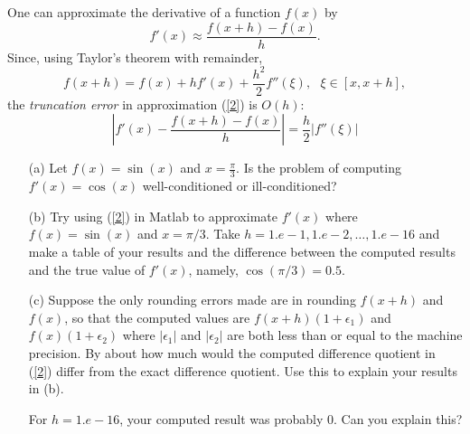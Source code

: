 \documentclass[10pt]{article}
\begin{document}
\begin{problem}[Problem 5]
    One can approximate the derivative of a function \( f(x) \) by
\begin{equation}
f' (x) \approx \frac{f(x+h)-f(x)}{h} . \label{2}
\end{equation}
Since, using Taylor's theorem with remainder,
\[ f(x+h) = f(x) + h f' (x) + \frac{h^2}{2} f'' ( \xi ) ,~~~\xi \in [x, x+h] , \]
the {\em truncation error} in approximation (\ref{2}) is $O(h)$:
\[ \left| f'(x) - \frac{f(x+h)-f(x)}{h} \right| = \frac{h}{2} \left| f'' ( \xi ) \right| \]
\begin{enumerate}
    \item[(a)] Let $f(x) = \sin (x)$ and $x = \frac{\pi}{3}$.  Is the problem of computing $f' (x) = \cos (x)$ well-conditioned or ill-conditioned?
    \item[(b)] Try using (\ref{2}) in Matlab to approximate $f'(x)$ where $f(x) = \sin (x)$ and $x = \pi / 3$. Take $h=1.e-1, 1.e-2, \ldots , 1.e-16$ and make a table of your results and the difference between the computed results and the true value of $f'(x)$, namely, $\cos ( \pi / 3 ) = 0.5$.
    \item[(c)] Suppose the only rounding errors made are in rounding $f(x+h)$ and $f(x)$, so that the computed values are $f(x+h)( 1 + \epsilon_1 )$ and $f(x) ( 1 + \epsilon_2 )$ where $| \epsilon_1 |$ and $| \epsilon_2 |$ are both less than or equal to the machine precision.  By about how much would the computed difference quotient in (\ref{2}) differ from the exact difference quotient. Use this to explain your results in (b).

    For $h = 1.e-16$, your computed result was probably $0$.  Can you explain this?
\end{enumerate}
\end{problem}
\end{document}
